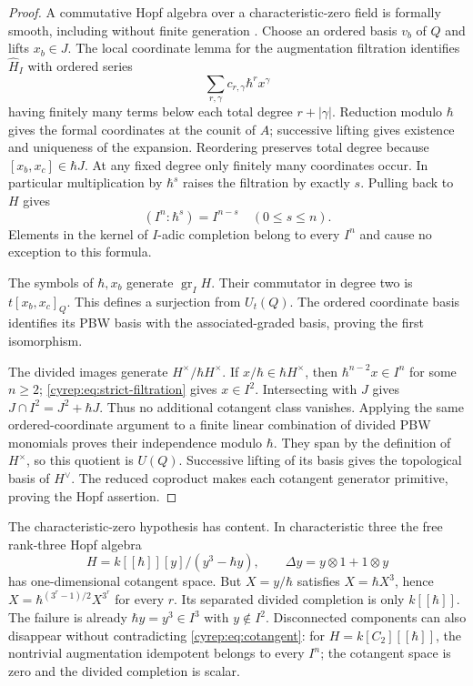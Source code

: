 \begin{proof}
A commutative Hopf algebra over a characteristic-zero field is
formally smooth, including without finite generation
\cite[Theorem 1.2(1), Section 3.1]{EgamiMasuokaSuzuki2024}.
Choose an ordered basis \(v_b\) of \(Q\) and lifts \(x_b\in J\).
The local coordinate lemma for the augmentation filtration
\cite[Lemma 4.1, Section 4.8]{Gavarini2003}
identifies \(\widehat H_I\) with ordered series
\[
 \sum_{r,\gamma}c_{r,\gamma}\hbar^r x^\gamma
\]
having finitely many terms below each total degree
\(r+|\gamma|\). Reduction modulo \(\hbar\) gives the formal
coordinates at the counit of \(A\); successive lifting gives
existence and uniqueness of the expansion.
Reordering preserves total degree because
\([x_b,x_c]\in\hbar J\).
At any fixed degree only finitely many coordinates occur.
In particular multiplication by \(\hbar^s\) raises the filtration
by exactly \(s\). Pulling back to \(H\) gives
\begin{equation}\label{cyrep:eq:strict-filtration}
 (I^n:\hbar^s)=I^{n-s}\quad(0\leq s\leq n).
\end{equation}
Elements in the kernel of \(I\)-adic completion belong to
every \(I^n\) and cause no exception to this formula.

The symbols of \(\hbar,x_b\) generate \(\operatorname{gr}_IH\).
Their commutator in degree two is \(t[x_b,x_c]_Q\).
This defines a surjection from \(U_t(Q)\).
The ordered coordinate basis identifies its PBW basis with
the associated-graded basis, proving the first isomorphism.

The divided images generate \(H^\times/\hbar H^\times\).
If \(x/\hbar\in\hbar H^\times\), then
\(\hbar^{n-2}x\in I^n\) for some \(n\geq2\);
\eqref{cyrep:eq:strict-filtration} gives \(x\in I^2\).
Intersecting with \(J\) gives \(J\cap I^2=J^2+\hbar J\).
Thus no additional cotangent class vanishes.
Applying the same ordered-coordinate argument to a finite
linear combination of divided PBW monomials proves their
independence modulo \(\hbar\). They span by the definition
of \(H^\times\), so this quotient is \(U(Q)\).
Successive lifting of its basis gives the topological basis
of \(H^\vee\). The reduced coproduct makes each cotangent
generator primitive, proving the Hopf assertion.
\end{proof}

The characteristic-zero hypothesis has content.
In characteristic three the free rank-three Hopf algebra
\[
 H=k[[\hbar]][y]/(y^3-\hbar y),\qquad \Delta y=y\otimes1+1\otimes y
\]
has one-dimensional cotangent space.
But \(X=y/\hbar\) satisfies \(X=\hbar X^3\), hence
\(X=\hbar^{(3^r-1)/2}X^{3^r}\) for every \(r\).
Its separated divided completion is only \(k[[\hbar]]\).
The failure is already
\(\hbar y=y^3\in I^3\) with \(y\notin I^2\).
Disconnected components can also disappear without contradicting
\eqref{cyrep:eq:cotangent}: for \(H=k[C_2][[\hbar]]\), the
nontrivial augmentation idempotent belongs to every \(I^n\);
the cotangent space is zero and the divided completion is scalar.

